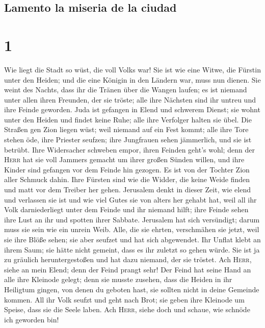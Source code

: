 \hypertarget{lamento-la-miseria-de-la-ciudad}{%
\subsection{Lamento la miseria de la
ciudad}\label{lamento-la-miseria-de-la-ciudad}}

\hypertarget{section}{%
\section{1}\label{section}}

 Wie liegt die Stadt so wüst, die voll Volks war! Sie ist
wie eine Witwe, die Fürstin unter den Heiden; und die eine Königin in
den Ländern war, muss nun dienen.  Sie weint des Nachts,
dass ihr die Tränen über die Wangen laufen; es ist niemand unter allen
ihren Freunden, der sie tröste; alle ihre Nächsten sind ihr untreu und
ihre Feinde geworden.  Juda ist gefangen in Elend und
schwerem Dienst; sie wohnt unter den Heiden und findet keine Ruhe; alle
ihre Verfolger halten sie übel.  Die Straßen gen Zion
liegen wüst; weil niemand auf ein Fest kommt; alle ihre Tore stehen öde,
ihre Priester seufzen; ihre Jungfrauen sehen jämmerlich, und sie ist
betrübt.  Ihre Widersacher schweben empor, ihren Feinden
geht's wohl; denn der \textsc{Herr} hat sie voll Jammers gemacht um
ihrer großen Sünden willen, und ihre Kinder sind gefangen vor dem Feinde
hin gezogen.  Es ist von der Tochter Zion aller Schmuck
dahin. Ihre Fürsten sind wie die Widder, die keine Weide finden und matt
vor dem Treiber her gehen.  Jerusalem denkt in dieser
Zeit, wie elend und verlassen sie ist und wie viel Gutes sie von alters
her gehabt hat, weil all ihr Volk darniederliegt unter dem Feinde und
ihr niemand hilft; ihre Feinde sehen ihre Lust an ihr und spotten ihrer
Sabbate.  Jerusalem hat sich versündigt; darum muss sie
sein wie ein unrein Weib. Alle, die sie ehrten, verschmähen sie jetzt,
weil sie ihre Blöße sehen; sie aber seufzet und hat sich abgewendet.
 Ihr Unflat klebt an ihrem Saum; sie hätte nicht gemeint,
dass es ihr zuletzt so gehen würde. Sie ist ja zu gräulich
heruntergestoßen und hat dazu niemand, der sie tröstet. Ach
\textsc{Herr}, siehe an mein Elend; denn der Feind prangt sehr!
 Der Feind hat seine Hand an alle ihre Kleinode gelegt;
denn sie musste zusehen, dass die Heiden in ihr Heiligtum gingen, von
denen du geboten hast, sie sollten nicht in deine Gemeinde kommen.
 All ihr Volk seufzt und geht nach Brot; sie geben ihre
Kleinode um Speise, dass sie die Seele laben. Ach \textsc{Herr}, siehe
doch und schaue, wie schnöde ich geworden bin!

